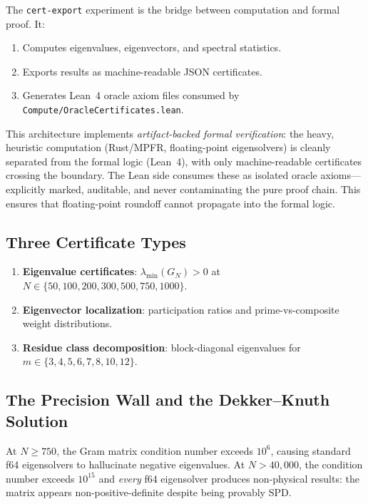 \documentclass[11pt,a4paper]{article}
\begin{document}
The \texttt{cert-export} experiment is the bridge between
computation and formal proof. It:
\begin{enumerate}
  \item Computes eigenvalues, eigenvectors, and spectral statistics.
  \item Exports results as machine-readable JSON certificates.
  \item Generates Lean~4 oracle axiom files consumed by
    \texttt{Compute/OracleCertificates.lean}.
\end{enumerate}

This architecture implements \emph{artifact-backed formal verification}:
the heavy, heuristic computation (Rust/MPFR, floating-point eigensolvers)
is cleanly separated from the formal logic (Lean~4), with only
machine-readable certificates crossing the boundary. The Lean side
consumes these as isolated oracle axioms---explicitly marked, auditable,
and never contaminating the pure proof chain. This ensures that
floating-point roundoff cannot propagate into the formal logic.

\subsection{Three Certificate Types}

\begin{enumerate}
  \item \textbf{Eigenvalue certificates}: $\lambda_{\min}(G_N) > 0$
    at $N \in \{50, 100, 200, 300, 500, 750, 1000\}$.
  \item \textbf{Eigenvector localization}: participation ratios
    and prime-vs-composite weight distributions.
  \item \textbf{Residue class decomposition}: block-diagonal
    eigenvalues for $m \in \{3,4,5,6,7,8,10,12\}$.
\end{enumerate}

\subsection{The Precision Wall and the Dekker--Knuth Solution}

At $N \geq 750$, the Gram matrix condition number exceeds $10^6$,
causing standard f64 eigensolvers to hallucinate negative eigenvalues.
At $N > 40{,}000$, the condition number exceeds $10^{15}$ and
\emph{every} f64 eigensolver produces non-physical results: the
matrix appears non-positive-definite despite being provably SPD.
\end{document}
